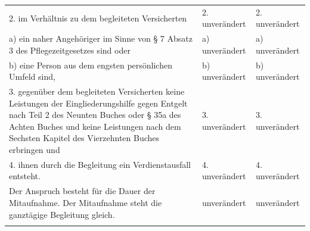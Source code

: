 \documentclass[10pt,a4paper,landscape]{article}
\begin{document}
\begin{longtable}{|L{8.2cm}|L{8.2cm}|L{8.2cm}|}
\hhline{|---|}
2.   \newline im Verhältnis zu dem begleiteten  \newline Versicherten & 2. unverändert & 2. unverändert \\
\hhline{|---|}
a)  \newline ein naher Angehöriger im Sinne von \S{} 7  \newline Absatz 3 des Pflegezeitgesetzes sind oder & a) unverändert & a) unverändert \\
\hhline{|---|}
b)  \newline eine Person aus dem engsten persönlichen  \newline Umfeld sind, & b) unverändert & b) unverändert \\
\hhline{|---|}
3. gegenüber dem begleiteten Versicherten  \newline keine Leistungen der Eingliederungshilfe  \newline gegen Entgelt nach Teil 2 des Neunten  \newline Buches oder \S{} 35a des Achten Buches und  \newline keine Leistungen nach dem Sechsten  \newline Kapitel des Vierzehnten Buches erbringen  \newline und & 3. unverändert & 3. unverändert \\
\hhline{|---|}
4. ihnen durch die Begleitung ein  \newline Verdienstausfall entsteht. & 4. unverändert & 4. unverändert \\
\hhline{|---|}
Der Anspruch besteht für die Dauer der  \newline Mitaufnahme. Der Mitaufnahme steht die  \newline ganztägige Begleitung gleich. & unverändert & unverändert \\
\hhline{|---|}

\end{longtable}
\end{document}
